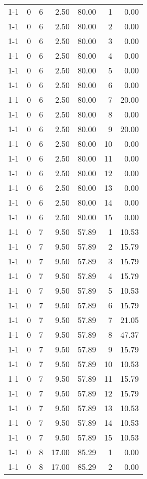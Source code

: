 \begin{tabular}{lrrrrrr}
1-1 & 0 & 6 & 2.50 & 80.00 & 1 & 0.00 \\
1-1 & 0 & 6 & 2.50 & 80.00 & 2 & 0.00 \\
1-1 & 0 & 6 & 2.50 & 80.00 & 3 & 0.00 \\
1-1 & 0 & 6 & 2.50 & 80.00 & 4 & 0.00 \\
1-1 & 0 & 6 & 2.50 & 80.00 & 5 & 0.00 \\
1-1 & 0 & 6 & 2.50 & 80.00 & 6 & 0.00 \\
1-1 & 0 & 6 & 2.50 & 80.00 & 7 & 20.00 \\
1-1 & 0 & 6 & 2.50 & 80.00 & 8 & 0.00 \\
1-1 & 0 & 6 & 2.50 & 80.00 & 9 & 20.00 \\
1-1 & 0 & 6 & 2.50 & 80.00 & 10 & 0.00 \\
1-1 & 0 & 6 & 2.50 & 80.00 & 11 & 0.00 \\
1-1 & 0 & 6 & 2.50 & 80.00 & 12 & 0.00 \\
1-1 & 0 & 6 & 2.50 & 80.00 & 13 & 0.00 \\
1-1 & 0 & 6 & 2.50 & 80.00 & 14 & 0.00 \\
1-1 & 0 & 6 & 2.50 & 80.00 & 15 & 0.00 \\
1-1 & 0 & 7 & 9.50 & 57.89 & 1 & 10.53 \\
1-1 & 0 & 7 & 9.50 & 57.89 & 2 & 15.79 \\
1-1 & 0 & 7 & 9.50 & 57.89 & 3 & 15.79 \\
1-1 & 0 & 7 & 9.50 & 57.89 & 4 & 15.79 \\
1-1 & 0 & 7 & 9.50 & 57.89 & 5 & 10.53 \\
1-1 & 0 & 7 & 9.50 & 57.89 & 6 & 15.79 \\
1-1 & 0 & 7 & 9.50 & 57.89 & 7 & 21.05 \\
1-1 & 0 & 7 & 9.50 & 57.89 & 8 & 47.37 \\
1-1 & 0 & 7 & 9.50 & 57.89 & 9 & 15.79 \\
1-1 & 0 & 7 & 9.50 & 57.89 & 10 & 10.53 \\
1-1 & 0 & 7 & 9.50 & 57.89 & 11 & 15.79 \\
1-1 & 0 & 7 & 9.50 & 57.89 & 12 & 15.79 \\
1-1 & 0 & 7 & 9.50 & 57.89 & 13 & 10.53 \\
1-1 & 0 & 7 & 9.50 & 57.89 & 14 & 10.53 \\
1-1 & 0 & 7 & 9.50 & 57.89 & 15 & 10.53 \\
1-1 & 0 & 8 & 17.00 & 85.29 & 1 & 0.00 \\
1-1 & 0 & 8 & 17.00 & 85.29 & 2 & 0.00 \\

\end{tabular}
